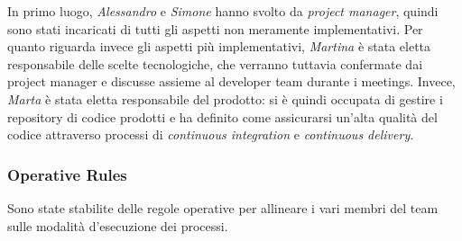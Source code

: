 In primo luogo, \textit{Alessandro} e \textit{Simone} hanno svolto da \textit{project manager}, quindi sono stati incaricati di tutti gli aspetti non meramente implementativi.
Per quanto riguarda invece gli aspetti più implementativi, \textit{Martina} è stata eletta responsabile delle scelte tecnologiche, che verranno tuttavia confermate dai project manager e discusse assieme al developer team durante i meetings. Invece, \textit{Marta} è stata eletta responsabile del prodotto: si è quindi occupata di gestire i repository di codice prodotti e ha definito come assicurarsi un'alta qualità del codice attraverso processi di \textit{continuous integration} e \textit{continuous delivery}.

\subsubsection{Operative Rules}
\label{sec:planning-operative-rules}
Sono state stabilite delle regole operative per allineare i vari membri del team sulle modalità d'esecuzione dei processi.
